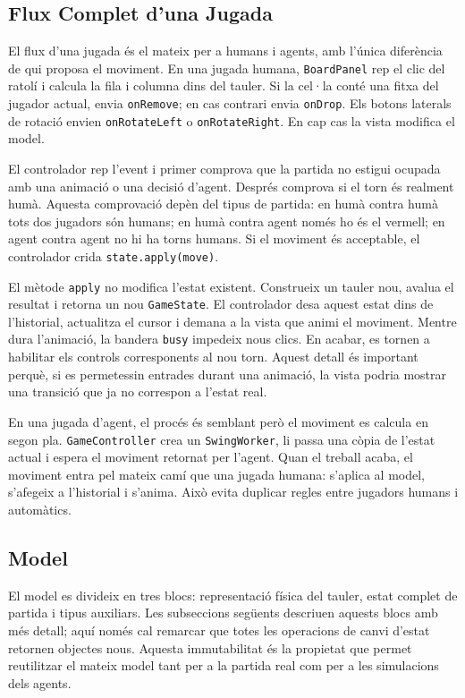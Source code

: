 \documentclass[conference,compsoc]{IEEEtran}
\begin{document}
\subsection{Flux Complet d'una Jugada}

El flux d'una jugada és el mateix per a humans i agents, amb l'única diferència de
qui proposa el moviment. En una jugada humana, \texttt{BoardPanel} rep el clic del
ratolí i calcula la fila i columna dins del tauler. Si la cel·la conté una fitxa
del jugador actual, envia \texttt{onRemove}; en cas contrari envia \texttt{onDrop}.
Els botons laterals de rotació envien \texttt{onRotateLeft} o
\texttt{onRotateRight}. En cap cas la vista modifica el model.

El controlador rep l'event i primer comprova que la partida no estigui ocupada amb
una animació o una decisió d'agent. Després comprova si el torn és realment humà.
Aquesta comprovació depèn del tipus de partida: en humà contra humà tots dos
jugadors són humans; en humà contra agent només ho és el vermell; en agent contra
agent no hi ha torns humans. Si el moviment és acceptable, el controlador crida
\texttt{state.apply(move)}.

El mètode \texttt{apply} no modifica l'estat existent. Construeix un tauler nou,
avalua el resultat i retorna un nou \texttt{GameState}. El controlador desa aquest
estat dins de l'historial, actualitza el cursor i demana a la vista que animi el
moviment. Mentre dura l'animació, la bandera \texttt{busy} impedeix nous clics. En
acabar, es tornen a habilitar els controls corresponents al nou torn. Aquest
detall és important perquè, si es permetessin entrades durant una animació, la
vista podria mostrar una transició que ja no correspon a l'estat real.

En una jugada d'agent, el procés és semblant però el moviment es calcula en segon
pla. \texttt{GameController} crea un \texttt{SwingWorker}, li passa una còpia de
l'estat actual i espera el moviment retornat per l'agent. Quan el treball acaba,
el moviment entra pel mateix camí que una jugada humana: s'aplica al model,
s'afegeix a l'historial i s'anima. Això evita duplicar regles entre jugadors
humans i automàtics.

\subsection{Model}

El model es divideix en tres blocs: representació física del tauler, estat complet
de partida i tipus auxiliars. Les subseccions següents descriuen aquests blocs amb
més detall; aquí només cal remarcar que totes les operacions de canvi d'estat
retornen objectes nous. Aquesta immutabilitat és la propietat que permet reutilitzar
el mateix model tant per a la partida real com per a les simulacions dels agents.
\end{document}
